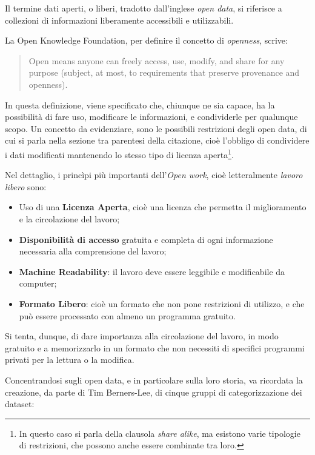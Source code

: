 \documentclass[a4paper,12pt]{report}
\newcommand{\quotestyle}[1]{\textit{#1}}
\begin{document}
Il termine dati aperti, o liberi, tradotto dall'inglese \quotestyle{open data}, 
si riferisce a collezioni di informazioni liberamente accessibili e 
utilizzabili. 

La Open Knowledge Foundation, per definire il concetto di \quotestyle{openness}, 
scrive: 

\begin{quotation}
    Open means anyone can freely access, use, modify, and share for any purpose 
    (subject, at most, to requirements that preserve provenance and openness). \cite{OPENDEFINITION:1}
\end{quotation}

In questa definizione, viene specificato che, chiunque ne sia capace, ha la possibilità di 
fare uso, modificare le informazioni, e condividerle per qualunque scopo. 
Un concetto da evidenziare, sono le possibili restrizioni degli open data, 
di cui si parla nella sezione tra parentesi della citazione, 
cioè l'obbligo di condividere i dati modificati 
mantenendo lo stesso tipo di licenza 
aperta\footnote{In questo caso si parla della clausola \quotestyle{share alike}, ma 
esistono varie tipologie di restrizioni, che possono anche essere combinate tra loro.}. 

Nel dettaglio, i princìpi più importanti dell'\quotestyle{Open work}, 
cioè letteralmente \quotestyle{lavoro libero} sono: 

\begin{itemize}
    \item Uso di una \textbf{Licenza Aperta}, cioè una licenza che permetta 
    il miglioramento e la circolazione del lavoro;
    \item \textbf{Disponibilità di accesso} gratuita e completa di ogni informazione necessaria 
    alla comprensione del lavoro; 
    \item \textbf{Machine Readability}: il lavoro deve essere leggibile e modificabile da computer; 
    \item \textbf{Formato Libero}: cioè un formato che non pone restrizioni di utilizzo, 
    e che può essere processato con almeno un programma gratuito.
\end{itemize}

Si tenta, dunque, di dare importanza alla circolazione del lavoro, in modo gratuito e
a memorizzarlo in un formato che non necessiti di specifici programmi privati 
per la lettura o la modifica.


Concentrandosi sugli open data, e in particolare sulla loro storia, 
va ricordata la creazione, da parte di 
Tim Berners-Lee, di cinque gruppi di categorizzazione dei dataset: 
\end{document}
